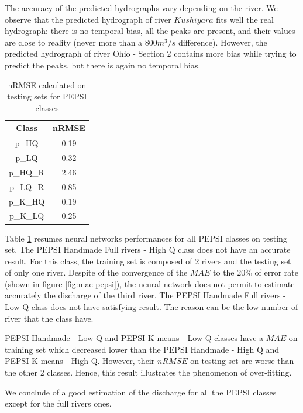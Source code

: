 The accuracy of the predicted hydrographs vary depending on the river. We observe that the predicted hydrograph of river $Kushiyara$ fits well the real hydrograph: there is no temporal bias, all the peaks are present, and their values are close to reality (never more than a $800 m^3/s$ difference). However, the predicted hydrograph of river Ohio - Section 2 contains more bias while trying to predict the peaks, but there is again no temporal bias. 


\begin{table}[H]
    \centering
    \begin{tabular}{|c|c|}
    \hline
    Class & nRMSE \\ \hline \hline 
         p\_HQ& 0.19 \\ \hline
         p\_LQ& 0.32\\ \hline
         p\_HQ\_R & 2.46\\ \hline 
         p\_LQ\_R & 0.85\\ \hline
         p\_K\_HQ & 0.19\\ \hline
         p\_K\_LQ & 0.25\\ \hline
    \end{tabular}
    \caption{nRMSE calculated on testing sets for PEPSI classes}
    \label{tab:nRMSE-PEPSI}
\end{table}

Table \ref{tab:nRMSE-PEPSI} resumes neural networks performances for all PEPSI classes on testing set. The PEPSI Handmade Full rivers - High Q class does not have an accurate result. For this class, the training set is composed of 2 rivers and the testing set of only one river. Despite of the convergence of the $MAE$ to the 20\% of error rate (shown in figure \ref{fig:mae pepsi}), the neural network does not permit to estimate accurately the discharge of the third river. The PEPSI Handmade Full rivers - Low Q class does not have satisfying result. The reason can be the low number of river that the class have.


PEPSI Handmade - Low Q  and PEPSI K-means - Low Q classes have a $MAE$ on training set which decreased lower than the PEPSI Handmade - High Q and PEPSI K-means - High Q. However, their $nRMSE$ on testing set are worse than the other 2 classes. Hence, this result illustrates the phenomenon of over-fitting. 

We conclude of a good estimation of the discharge for all the PEPSI classes except for the full rivers ones.   